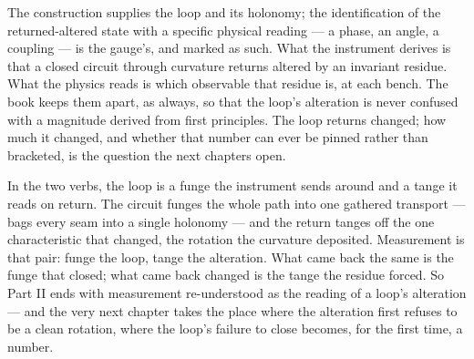 The construction supplies the loop and its holonomy; the identification of the returned-altered state with a specific
physical reading --- a phase, an angle, a coupling --- is the gauge's, and marked as such. What the instrument derives is
that a closed circuit through curvature returns altered by an invariant residue. What the physics reads is which observable
that residue is, at each bench. The book keeps them apart, as always, so that the loop's alteration is never confused with a
magnitude derived from first principles. The loop returns changed; how much it changed, and whether that number can ever be
pinned rather than bracketed, is the question the next chapters open.

In the two verbs, the loop is a funge the instrument sends around and a tange it reads on return. The circuit funges the
whole path into one gathered transport --- bags every seam into a single holonomy --- and the return tanges off the one
characteristic that changed, the rotation the curvature deposited. Measurement is that pair: funge the loop, tange the
alteration. What came back the same is the funge that closed; what came back changed is the tange the residue forced. So Part
II ends with measurement re-understood as the reading of a loop's alteration --- and the very next chapter takes the place
where the alteration first refuses to be a clean rotation, where the loop's failure to close becomes, for the first time, a
number.
